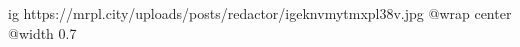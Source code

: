  
 
 
 
 

\ifcmt
  ig https://mrpl.city/uploads/posts/redactor/igeknvmytmxpl38v.jpg
  @wrap center
  @width 0.7
\fi
